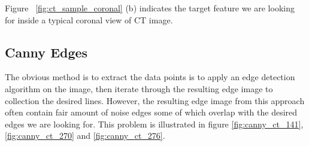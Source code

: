 Figure ~\ref{fig:ct_sample_coronal} (b) indicates the target feature we are looking for inside a typical coronal view of CT image.

\subsection{Canny Edges}

The obvious method is to extract the data points is to apply an edge detection algorithm on the image, then
iterate through the resulting edge image to collection the desired lines. However, the resulting edge image from
this approach often contain fair amount of noise edges some of which overlap with the desired edges we are looking
for. This problem is illustrated in figure \ref{fig:canny_ct_141}, \ref{fig:canny_ct_270} and \ref{fig:canny_ct_276}.
 
